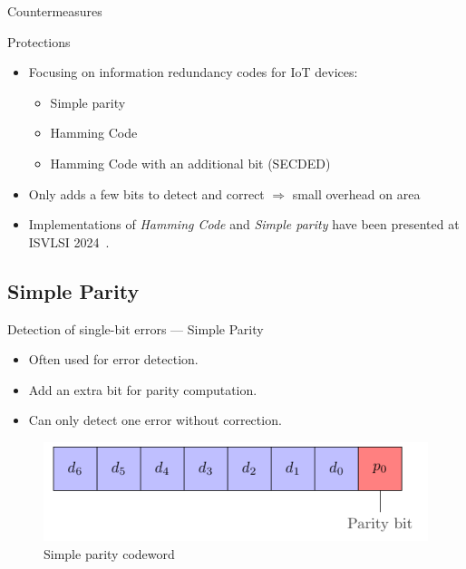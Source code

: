 \begin{frame}{Countermeasures}
    \begin{block}{Protections}
        \begin{itemize}
            \item Focusing on information redundancy codes for IoT devices:
            \begin{itemize}
                \item Simple parity
                \item Hamming Code
                \item Hamming Code with an additional bit (SECDED)
            \end{itemize}
            \item Only adds a few bits to detect and correct $\Rightarrow$ small overhead on area
            \item Implementations of \textit{Hamming Code} and \textit{Simple parity} have been presented at ISVLSI 2024~\cite{PRLG-24-isvlsi}.
        \end{itemize}
    \end{block}
\end{frame}
\subsection{Simple Parity}
    \begin{frame}{Detection of single-bit errors — Simple Parity}
        \begin{block}{}
            \begin{itemize}
                \justifying
                \item Often used for error detection.
                \item Add an extra bit for parity computation.
                \item Can only detect one error without correction.
            \end{itemize}
        \end{block}

        \vfill
        
        \begin{figure}
            \centering
            \includegraphics[width=.5\textwidth, page=1]{src/4_strategies/img/simple_parity.pdf}
            \caption{Simple parity codeword}
            \label{fig:simple_parity_codeword}
        \end{figure}
    \end{frame}
